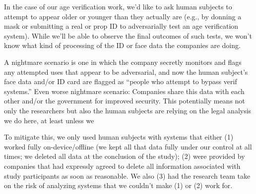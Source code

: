 In the case of our age verification work, we’d like to ask human subjects to attempt to appear older or younger than they actually are (e.g., by donning a mask or submitting a real or prop ID to adversarially test an age verification system).
While we'll be able to observe the final outcomes of such tests, we won't know what kind of processing of the ID or face data the companies are doing.

A nightmare scenario is one in which the company secretly monitors and flags any attempted uses that appear to be adversarial, and now the human subject’s face data and/or ID card are flagged as “people who attempt to bypass verif systems.”  Even worse nightmare scenario: Companies share this data with each other and/or the government for improved security. This potentially means not only the researchers but also the human subjects are relying on the legal analysis we do here, at least unless we 

To mitigate this, we only used human subjects with systems that either (1) worked fully on-device/offline (we kept all that data fully under our control at all times; we deleted all data at the conclusion of the study); (2) were provided by companies that had expressly agreed to delete all information associated with study participants as soon as reasonable. We also (3) had the research team take on the risk of analyzing systems that we couldn't make (1) or (2) work for.

